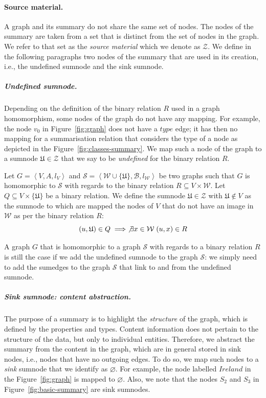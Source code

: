 \paragraph{Source material.}

A graph and its summary do not share the same set of nodes. The nodes of the summary are taken from a set that is distinct from the set of nodes in the graph. We refer to that set as the \emph{source material} which we denote as $\mathcal{Z}$. We define in the following paragraphs two nodes of the summary that are used in its creation, i.e., the undefined sumnode and the sink sumnode.

\subparagraph{Undefined sumnode.}
\label{sec:undefined-sumnode}

Depending on the definition of the binary relation $R$ used in a graph homomorphism, some nodes of the graph do not have any mapping. For example, the node $v_0$ in Figure~\ref{fig:graph} does not have a $type$ edge; it has then no mapping for a summarisation relation that considers the type of a node as depicted in the Figure~\ref{fig:classes-summary}.
We map such a node of the graph to a sumnode $\mathfrak{U} \in \mathcal{Z}$ that we say to be \emph{undefined} for the binary relation $R$.

\begin{definition}
Let $G=\left\langle V, A, l_V \right\rangle$ and $\mathcal{S}=\left\langle \mathcal{W} \cup \{ \mathfrak{U} \}, \mathcal{B}, l_\mathcal{W} \right\rangle$ be two graphs such that $G$ is homomorphic to $\mathcal{S}$ with regards to the binary relation $R \subseteq V \times \mathcal{W}$.
Let $Q \subseteq V \times \{ \mathfrak{U} \}$ be a binary relation.
We define the sumnode $\mathfrak{U} \in \mathcal{Z}$ with $\mathfrak{U} \not \in V$ as the sumnode to which are mapped the nodes of $V$ that do not have an image in $\mathcal{W}$ as per the binary relation $R$:
$$
(u, \mathfrak{U}) \in Q \implies \not \exists x \in \mathcal{W}\; (u, x) \in R
$$
\end{definition}

A graph $G$ that is homomorphic to a graph $\mathcal{S}$ with regards to a binary relation $R$ is still the case if we add the undefined sumnode to the graph $\mathcal{S}$: we simply need to add the sumedges to the graph $\mathcal{S}$ that link to and from the undefined sumnode.

\subparagraph{Sink sumnode: content abstraction.}

The purpose of a summary is to highlight the \emph{structure} of the graph, which is defined by the properties and types. Content information does not pertain to the structure of the data, but only to individual entities. Therefore, we abstract the summary from the content in the graph, which are in general stored in sink nodes, i.e., nodes that have no outgoing edges. To do so, we map such nodes to a \emph{sink} sumnode that we identify as $\varnothing$. For example, the node labelled $Ireland$ in the Figure~\ref{fig:graph} is mapped to $\varnothing$. Also, we note that the nodes $S_2$ and $S_3$ in Figure~\ref{fig:basic-summary} are sink sumnodes.

